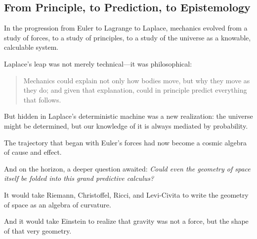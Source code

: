 \bigskip

\subsection*{From Principle, to Prediction, to Epistemology}

In the progression from Euler to Lagrange to Laplace,  
mechanics evolved from a study of forces, to a study of principles, to a study of the universe as a knowable, calculable system.

Laplace’s leap was not merely technical—it was philosophical:

\begin{quote}
Mechanics could explain not only how bodies move, but why they move as they do;  
and given that explanation, could in principle predict everything that follows.
\end{quote}

But hidden in Laplace’s deterministic machine was a new realization:  
the universe might be determined, but our knowledge of it is always mediated by probability.

The trajectory that began with Euler’s forces had now become a cosmic algebra of cause and effect.

And on the horizon, a deeper question awaited:  
\emph{Could even the geometry of space itself be folded into this grand predictive calculus?}

It would take Riemann, Christoffel, Ricci, and Levi-Civita to write the geometry of space as an algebra of curvature.

And it would take Einstein to realize that gravity was not a force, but the shape of that very geometry.

